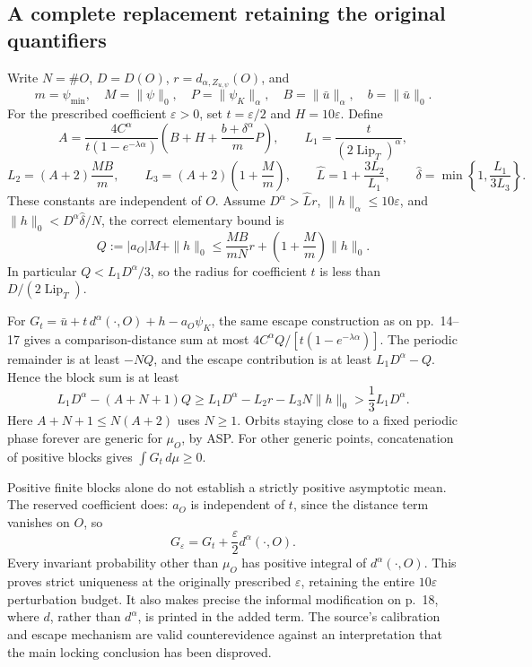 \documentclass[10pt]{article}
\begin{document}
\subsection*{A complete replacement retaining the original quantifiers}
Write \(N=\#O\), \(D=D(O)\), \(r=d_{\alpha,Z_{u,\psi}}(O)\), and \[m=\psi_{\min},\quad M=\|\psi\|_0,\quad P=\|\psi_K\|_\alpha,\quad
 B=\|\bar u\|_\alpha,\quad b=\|\bar u\|_0.\] For the prescribed coefficient \(\varepsilon>0\), set \(t=\varepsilon/2\) and \(H=10\varepsilon\). Define \[A=\frac{4C^\alpha}{t(1-e^{-\lambda\alpha})}
       \left(B+H+\frac{b+\delta^\alpha}{m}P\right),
 \qquad L_1=\frac{t}{(2\operatorname{Lip}_T)^\alpha},\] \[L_2=(A+2)\frac{MB}{m},\qquad
 L_3=(A+2)\left(1+\frac{M}{m}\right),\qquad
 \widehat L=1+\frac{3L_2}{L_1},\qquad
 \widehat\delta=\min\left\{1,\frac{L_1}{3L_3}\right\}.\] These constants are independent of \(O\). Assume \(D^\alpha>\widehat Lr\), \(\|h\|_\alpha\le10\varepsilon\), and \(\|h\|_0<D^\alpha\widehat\delta/N\), the correct elementary bound is \[Q:=|a_O|M+\|h\|_0
 \le \frac{MB}{mN}r+\left(1+\frac{M}{m}\right)\|h\|_0.\] In particular \(Q<L_1D^\alpha/3\), so the radius for coefficient \(t\) is less than \(D/(2\operatorname{Lip}_T)\).\par
For \(G_t=\bar u+t\,d^\alpha(\cdot,O)+h-a_O\psi_K\), the same escape construction as on pp. 14–17 gives a comparison-distance sum at most \(4C^\alpha Q/[t(1-e^{-\lambda\alpha})]\). The periodic remainder is at least \(-NQ\), and the escape contribution is at least \(L_1D^\alpha-Q\). Hence the block sum is at least \[L_1D^\alpha-(A+N+1)Q
 \ge L_1D^\alpha-L_2r-L_3N\|h\|_0
 >\frac13L_1D^\alpha.\] Here \(A+N+1\le N(A+2)\) uses \(N\ge1\). Orbits staying close to a fixed periodic phase forever are generic for \(\mu_O\), by ASP. For other generic points, concatenation of positive blocks gives \(\int G_t\,d\mu\ge0\).\par
Positive finite blocks alone do not establish a strictly positive asymptotic mean. The reserved coefficient does: \(a_O\) is independent of \(t\), since the distance term vanishes on \(O\), so \[G_\varepsilon=G_t+\frac{\varepsilon}{2}d^\alpha(\cdot,O).\] Every invariant probability other than \(\mu_O\) has positive integral of \(d^\alpha(\cdot,O)\). This proves strict uniqueness at the originally prescribed \(\varepsilon\), retaining the entire \(10\varepsilon\) perturbation budget. It also makes precise the informal modification on p. 18, where \(d\), rather than \(d^\alpha\), is printed in the added term. The source’s calibration and escape mechanism are valid counterevidence against an interpretation that the main locking conclusion has been disproved.\par
\end{document}
